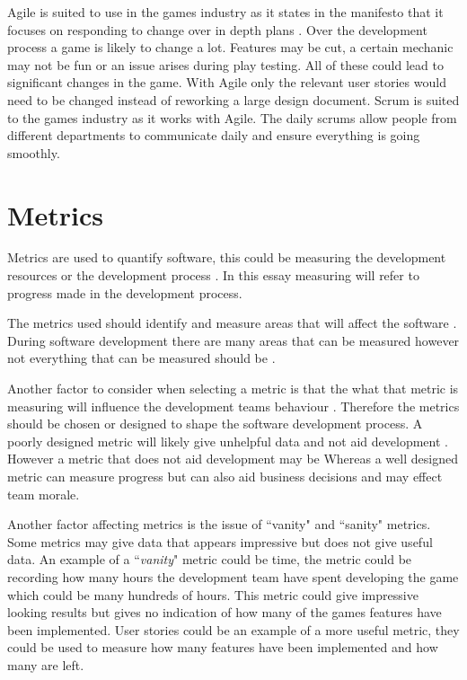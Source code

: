 \documentclass{scrartcl}
\begin{document}
Agile is suited to use in the games industry as it states in the manifesto that it focuses on responding to change over in depth plans \cite{AgileManifesto}.  Over the development process a game is likely to change a lot. Features may be cut, a certain mechanic may not be fun or an issue arises during play testing. All of these could lead to significant changes in the game. With Agile only the relevant user stories would need to be changed instead of reworking a large design document. Scrum is suited to the games industry as it works with Agile. The daily scrums allow people from different departments to communicate daily and ensure everything is going smoothly.


\section{Metrics}

Metrics are used to quantify software, this could be measuring the development resources or the development process \cite{Misra}. In this essay measuring will refer to progress made in the development process. 

The metrics used should identify and measure areas that will affect the software \cite{Misra}. During software development there are many areas that can be measured however not everything that can be measured should be \cite{Hartmann}.

Another factor to consider when selecting a metric is that the what that metric is measuring will influence the development teams behaviour \cite{Hartmann}. Therefore the metrics should be chosen or  designed to shape the software development process. A poorly designed metric will likely give unhelpful data and not aid development \cite{Ktata}. However a metric that does not aid development may be  Whereas a well designed metric can measure progress but can also aid business decisions and may effect team morale. \cite{Misra}

Another factor affecting metrics is the issue of ``vanity" and ``sanity" metrics. Some metrics may give data that appears impressive but does not give useful data. An example of a ``\textit{vanity}" metric could be time, the metric could be recording how many hours the development team have spent developing the game which could be many hundreds of hours. This metric could give impressive looking results but gives no indication of how many of the games features have been implemented. User stories could be an example of a more useful metric, they could be used to measure how many features have been implemented and how many are left.
\end{document}
